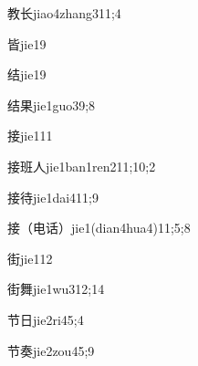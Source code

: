 \begin{verbete}{教长}{jiao4zhang3}{11;4}
\end{verbete}

\begin{verbete}{皆}{jie1}{9}
\end{verbete}

\begin{verbete}{结}{jie1}{9}
\end{verbete}

\begin{verbete}{结果}{jie1guo3}{9;8}
\end{verbete}

\begin{verbete}{接}{jie1}{11}
\end{verbete}

\begin{verbete}{接班人}{jie1ban1ren2}{11;10;2}
\end{verbete}

\begin{verbete}{接待}{jie1dai4}{11;9}
\end{verbete}

\begin{verbete}{接（电话）}{jie1(dian4hua4)}{11;5;8}
\end{verbete}

\begin{verbete}{街}{jie1}{12}
\end{verbete}

\begin{verbete}{街舞}{jie1wu3}{12;14}
\end{verbete}

\begin{verbete}{节日}{jie2ri4}{5;4}
\end{verbete}

\begin{verbete}{节奏}{jie2zou4}{5;9}
\end{verbete}


